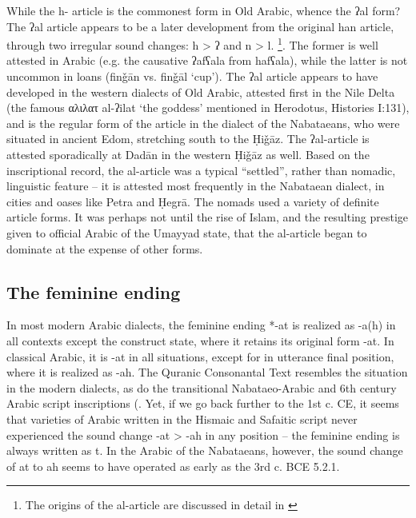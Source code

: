 \documentclass[output=paper]{langsci/langscibook}
\begin{document}
While the h- article is the commonest form in Old Arabic, whence the ʔal form? The ʔal article appears to be a later development from the original han article, through two irregular sound changes: h > ʔ and n > l. \footnote{The origins of the al-article are discussed in detail in \citep{Al-Jalladforth.b}}.  The former is well attested in Arabic (e.g. the causative ʔafʕala from hafʕala), while the latter is not uncommon in loans (finǧān vs. finǧāl ‘cup’). The ʔal article appears to have developed in the western dialects of Old Arabic, attested first in the Nile Delta (the famous αλιλατ al-ʔilat ‘the goddess’ mentioned in Herodotus, Histories I:131), and is the regular form of the article in the dialect of the Nabataeans, who were situated in ancient Edom, stretching south to the Ḥiǧāz. The ʔal-article is attested sporadically at Dadān in the western Ḥiǧāz as well. Based on the inscriptional record, the al-article was a typical “settled”, rather than nomadic, linguistic feature – it is attested most frequently in the Nabataean dialect, in cities and oases like Petra and Ḥegrā. The nomads used a variety of definite article forms. It was perhaps not until the rise of Islam, and the resulting prestige given to official Arabic of the Umayyad state, that the al-article began to dominate at the expense of other forms.

\subsection{The feminine ending}
In most modern Arabic dialects, the feminine ending *-at is realized as -a(h) in all contexts except the construct state, where it retains its original form -at. In classical Arabic, it is -at in all situations, except for in utterance final position, where it is realized as -ah. The Quranic Consonantal Text resembles the situation in the modern dialects, as do the transitional Nabataeo-Arabic and 6th century Arabic script inscriptions (\citet{Nehmé2017}. Yet, if we go back further to the 1st c. CE, it seems that varieties of Arabic written in the Hismaic and Safaitic script never experienced the sound change -at > -ah in any position – the feminine ending is always written as t. In the Arabic of the Nabataeans, however, the sound change of at to ah seems to have operated as early as the 3rd c. BCE \citet{Al-Jallad2017} 5.2.1. 
\end{document}

